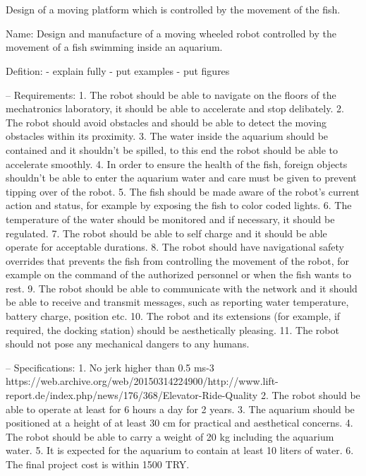 \documentclass[a4paper, 10pt, DIV=16, parskip = full, twocolumn = true]{scrartcl}
\title{}
\author{Ali Levent Çınar / 2234532}
\date{MONTH DAY, 2019}
\begin{document}
	\maketitle
	\thispagestyle{scrheadings}

\section{}

Design of a moving platform which is controlled by the movement of the fish.


Name: Design and manufacture of a moving wheeled robot controlled by the movement of a fish swimming inside an aquarium.

Defition:
- explain fully
- put examples
- put figures

-- Requirements:
1. The robot should be able to navigate on the floors of the mechatronics laboratory, it should be able to accelerate and stop delibately.
2. The robot should avoid obstacles and should be able to detect the moving obstacles within its proximity.
3. The water inside the aquarium should be contained and it shouldn't be spilled, to this end the robot should be able to accelerate smoothly.
4. In order to ensure the health of the fish, foreign objects shouldn't be able to enter the aquarium water and care must be given to prevent tipping over of the robot.
5. The fish should be made aware of the robot's current action and status, for example by exposing the fish to color coded lights. 
6. The temperature of the water should be monitored and if necessary, it should be regulated.
7. The robot should be able to self charge and it should be able operate for acceptable durations.
8. The robot should have navigational safety overrides that prevents the fish from controlling the movement of the robot, for example on the command of the authorized personnel or when the fish wants to rest.
9. The robot should be able to communicate with the network and it should be able to receive and transmit messages, such as reporting water temperature, battery charge, position etc.
10. The robot and its extensions (for example, if required, the docking station) should be aesthetically pleasing.
11. The robot should not pose any mechanical dangers to any humans.

-- Specifications:
1. No jerk higher than 0.5 ms-3
https://web.archive.org/web/20150314224900/http://www.lift-report.de/index.php/news/176/368/Elevator-Ride-Quality
2. The robot should be able to operate at least for 6 hours a day for 2 years.
3. The aquarium should be positioned at a height of at least 30 cm for practical and aesthetical concerns.
4. The robot should be able to carry a weight of 20 kg including the aquarium water.
5. It is expected for the aquarium to contain at least 10 liters of water.
6. The final project cost is within 1500 TRY.
\end{document}
